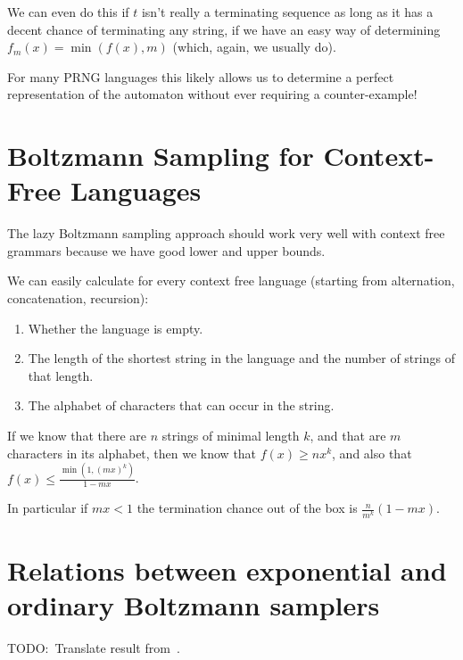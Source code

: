We can even do this if \(t\) isn't really a terminating sequence as long as it has a decent chance of terminating any string,
if we have an easy way of determining \(f_m(x) = \min(f(x), m)\) (which, again, we usually do).

For many PRNG languages this likely allows us to determine a perfect representation of the automaton without ever requiring a counter-example!

\section{Boltzmann Sampling for Context-Free Languages}

The lazy Boltzmann sampling approach should work very well with context free grammars because we have good lower and upper bounds.

We can easily calculate for every context free language (starting from alternation, concatenation, recursion):

\begin{enumerate}
\item Whether the language is empty.
\item The length of the shortest string in the language and the number of strings of that length.
\item The alphabet of characters that can occur in the string.
\end{enumerate}

If we know that there are \(n\) strings of minimal length \(k\),
and that are \(m\) characters in its alphabet,
then we know that \(f(x) \geq n x^k\),
and also that \(f(x) \leq \frac{\min(1, {(mx)}^k)}{1 - m x}\).

In particular if \(mx < 1\) the termination chance out of the box is \(\frac{n}{m^k} (1 - mx)\).

\section{Relations between exponential and ordinary Boltzmann samplers}

TODO:\ Translate result from~\cite{DBLP:journals/corr/abs-1006-2902}.
